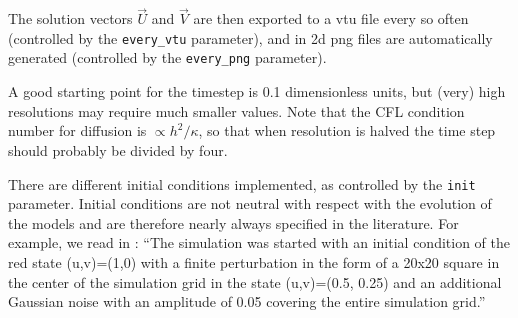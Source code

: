 The solution vectors $\vec{U}$ and $\vec{V}$ are then exported to 
a vtu file every so often (controlled by the \lstinline{every_vtu} parameter),
and in 2d png files are automatically generated (controlled by 
the \lstinline{every_png} parameter).

A good starting point for the timestep is 0.1 dimensionless units, but 
(very) high resolutions may require much smaller values.
Note that the CFL condition number for diffusion is $\propto h^2/\kappa$, 
so that when resolution is halved the time step should probably be divided by four. 

There are different initial conditions implemented, as controlled by the \lstinline{init} parameter.
Initial conditions are not neutral with respect with the evolution of the models and 
are therefore nearly always specified in the literature. For example, we
read in \cite{haqh16}: 
``The simulation was started with an initial condition of the
red state (u,v)=(1,0) with a finite perturbation in the form of a 20x20 square in the
center of the simulation grid in the state (u,v)=(0.5, 0.25) and an additional Gaussian
noise with an amplitude of 0.05 covering the entire simulation grid.''


